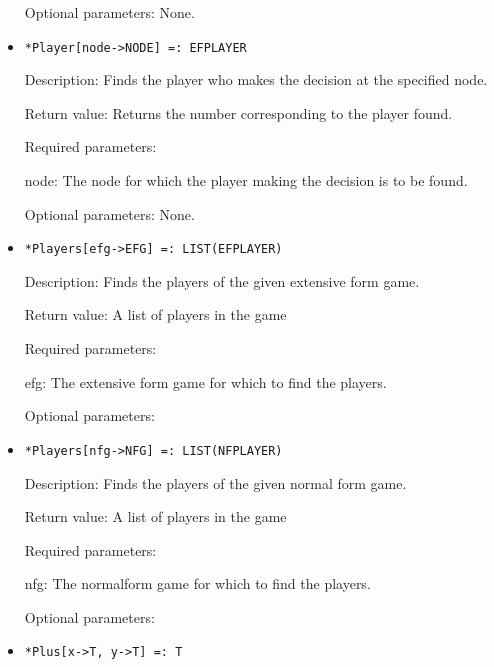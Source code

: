 \begin{itemize}
\item
[Optional parameters:] None.\hfil\null
\ed

\item
\protect \large \begin{verbatim}
*Player[node->NODE] =: EFPLAYER
\end{verbatim}\normalsize

\bd
\item
[Description:] Finds the player who makes the decision at the
specified node.
\item
[Return value:] Returns the number corresponding to the player found.
\item
[Required parameters:]\hfil\null

\bd
\item
[node:] The node for which the player making the decision is to be found.
\ed

\item
[Optional parameters:] None.
\ed

\item
\protect \large \begin{verbatim}
*Players[efg->EFG] =: LIST(EFPLAYER)
\end{verbatim} \normalsize

\bd
\item
[Description:] Finds the players of the given extensive form game. 
\item
[Return value:]  A list of players in the game
\item
[Required parameters:]
\bd
\item
[efg:] The extensive form game for which to find the players.  
\ed
\item
[Optional parameters:]
\ed

\item
\protect \large \begin{verbatim}
*Players[nfg->NFG] =: LIST(NFPLAYER)
\end{verbatim} \normalsize

\bd
\item
[Description:] Finds the players of the given normal form game. 
\item
[Return value:]  A list of players in the game
\item
[Required parameters:]
\bd
\item
[nfg:] The normalform game for which to find the players.  
\ed
\item
[Optional parameters:]
\ed

\item 
\protect \large \begin{verbatim}
*Plus[x->T, y->T] =: T
\end{verbatim} \normalsize


\end{itemize}
